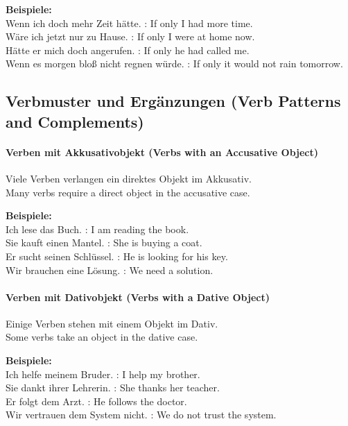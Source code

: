 \documentclass[a4paper]{article}
\begin{document}
        \textbf{Beispiele:}\\
        Wenn ich doch mehr Zeit hätte. : If only I had more time.\\
        Wäre ich jetzt nur zu Hause. : If only I were at home now.\\
        Hätte er mich doch angerufen. : If only he had called me.\\
        Wenn es morgen bloß nicht regnen würde. : If only it would not rain tomorrow.
    
    \subsection{Verbmuster und Ergänzungen {\small (Verb Patterns and Complements)}}
    
    \paragraph{Verben mit Akkusativobjekt {\small (Verbs with an Accusative Object)}}
        Viele Verben verlangen ein direktes Objekt im Akkusativ.\\
        Many verbs require a direct object in the accusative case.
        
        \textbf{Beispiele:}\\
        Ich lese das Buch. : I am reading the book.\\
        Sie kauft einen Mantel. : She is buying a coat.\\
        Er sucht seinen Schlüssel. : He is looking for his key.\\
        Wir brauchen eine Lösung. : We need a solution.
    
    \paragraph{Verben mit Dativobjekt {\small (Verbs with a Dative Object)}}
        Einige Verben stehen mit einem Objekt im Dativ.\\
        Some verbs take an object in the dative case.
        
        \textbf{Beispiele:}\\
        Ich helfe meinem Bruder. : I help my brother.\\
        Sie dankt ihrer Lehrerin. : She thanks her teacher.\\
        Er folgt dem Arzt. : He follows the doctor.\\
        Wir vertrauen dem System nicht. : We do not trust the system.
    
\end{document}
